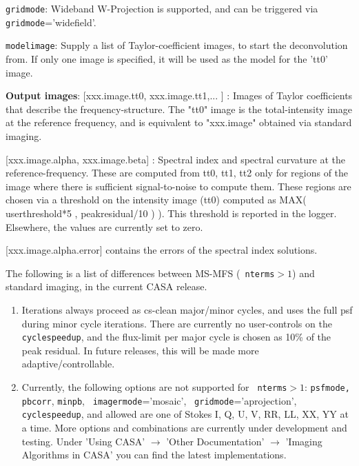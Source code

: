{\tt gridmode}: Wideband W-Projection is supported, and can be
triggered via {\tt gridmode}='widefield'.


{\tt modelimage}: Supply a list of Taylor-coefficient images, to start the deconvolution from.  
               If only one image is specified, it will be used as the model for the 'tt0' image. 
     

{\bf Output images}: [xxx.image.tt0,
               xxx.image.tt1,... ] : Images of Taylor coefficients
               that describe the frequency-structure.  The "tt0" image
               is the total-intensity image at the reference
               frequency, and is equivalent to "xxx.image" obtained
               via standard imaging.


               [xxx.image.alpha, xxx.image.beta] : Spectral index and
               spectral curvature at the reference-frequency. These
               are computed from tt0, tt1, tt2 only for regions of the
               image where there is sufficient signal-to-noise to
               compute them. These regions are chosen via a threshold
               on the intensity image (tt0) computed as MAX(
               userthreshold*5 , peakresidual/10 ) ). This threshold
               is reported in the logger.  Elsewhere, the values are
               currently set to zero.

                [xxx.image.alpha.error] contains the errors of the
                spectral index solutions.


The following is a list of differences between MS-MFS ({\tt
                 nterms}$>1$) and standard imaging, in the current
               CASA release.

\begin{enumerate}


\item Iterations always proceed as cs-clean major/minor cycles, and
  uses the full psf during minor cycle iterations. There are currently
  no user-controls on the {\tt cyclespeedup}, and the flux-limit per major cycle is
  chosen as 10\% of the peak residual. In future releases, this will
  be made more adaptive/controllable.

\item Currently, the following options are not supported for {\tt
    nterms}$>1$: {\tt psfmode,} {\tt pbcorr}, {\tt minpb}, {\tt
    imagermode}='mosaic', {\tt
    gridmode}='aprojection', {\tt cyclespeedup}, and allowed are one
  of Stokes I, Q, U, V, RR, LL, XX, YY at a time. More options and combinations are currently under
  development and testing. Under 'Using CASA' $\rightarrow$ 'Other
  Documentation' $\rightarrow$ 'Imaging Algorithms in CASA' you can
  find the latest implementations. 

\end{enumerate}


